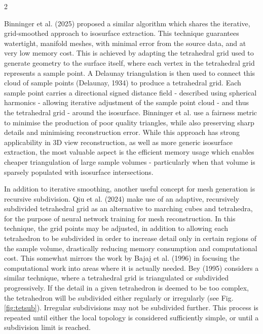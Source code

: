 \documentclass[]{article}
\newenvironment{singlecolfigure}
  {\par\medskip\noindent\minipage{\linewidth}}
  {\endminipage\par\medskip}
\begin{document}
\begin{multicols}{2}
\FloatBarrier

Binninger et al. (2025) proposed a similar algorithm which shares the iterative, grid-smoothed approach to isosurface extraction. This technique guarantees watertight, manifold meshes, with minimal error from the source data, and at very low memory cost. This is achieved by adapting the tetrahedral grid used to generate geometry to the surface itself, where each vertex in the tetrahedral grid represents a sample point. A Delaunay triangulation is then used to connect this cloud of sample points (Delaunay, 1934) to produce a tetrahedral grid. Each sample point carries a directional signed distance field - described using spherical harmonics - allowing iterative adjustment of the sample point cloud - and thus the tetrahedral grid - around the isosurface. Binninger et al. use a \textquotesingle fairness\textquotesingle{} metric to minimise the production of poor quality triangles, while also preserving sharp details and minimising reconstruction error. While this approach has strong applicability in 3D view reconstruction, as well as more generic isosurface extraction, the most valuable aspect is the efficient memory usage which enables cheaper triangulation of large sample volumes - particularly when that volume is sparsely populated with isosurface intersections.

In addition to iterative smoothing, another useful concept for mesh generation is recursive subdivision. Qiu et al. (2024) make use of an adaptive, recursively subdivided tetrahedral grid as an alternative to marching cubes and tetrahedra, for the purpose of neural network training for mesh reconstruction. In this technique, the grid points may be adjusted, in addition to allowing each tetrahedron to be subdivided in order to increase detail only in certain regions of the sample volume, drastically reducing memory consumption and computational cost. This somewhat mirrors the work by Bajaj et al. (1996) in focusing the computational work into areas where it is actually needed. Bey (1995) considers a similar technique, where a tetrahedral grid is triangulated or subdivided progressively. If the detail in a given tetrahedron is deemed to be too complex, the tetrahedron will be subdivided either regularly or irregularly (see Fig. \ref{fig:tetsub}). Irregular subdivisions may not be subdivided further. This process is repeated until either the local topology is considered sufficiently simple, or until a subdivision limit is reached.

\begin{singlecolfigure}
    \centering
    
    \label{fig:tetsub}
\end{singlecolfigure}


\end{multicols}
\end{document}

